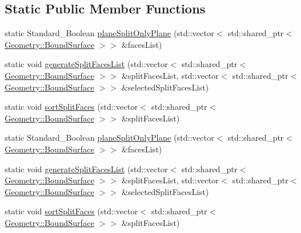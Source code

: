 \subsection*{Static Public Member Functions}
\begin{DoxyCompactItemize}
\item 
static Standard\+\_\+\+Boolean \hyperlink{classMcCAD_1_1Decomposition_1_1SplitSurfaces_1_1Impl_afb4f6c10fc6885bef90911da17ca9836}{plane\+Split\+Only\+Plane} (std\+::vector$<$ std\+::shared\+\_\+ptr$<$ \hyperlink{classMcCAD_1_1Geometry_1_1BoundSurface}{Geometry\+::\+Bound\+Surface} $>$$>$ \&faces\+List)
\item 
static void \hyperlink{classMcCAD_1_1Decomposition_1_1SplitSurfaces_1_1Impl_a4430db732d0f33db4b1aaa1ef38fbe76}{generate\+Split\+Faces\+List} (std\+::vector$<$ std\+::shared\+\_\+ptr$<$ \hyperlink{classMcCAD_1_1Geometry_1_1BoundSurface}{Geometry\+::\+Bound\+Surface} $>$$>$ \&split\+Faces\+List, std\+::vector$<$ std\+::shared\+\_\+ptr$<$ \hyperlink{classMcCAD_1_1Geometry_1_1BoundSurface}{Geometry\+::\+Bound\+Surface} $>$$>$ \&selected\+Split\+Faces\+List)
\item 
static void \hyperlink{classMcCAD_1_1Decomposition_1_1SplitSurfaces_1_1Impl_ab385ab8a9096d1617a54dd2080956a0a}{sort\+Split\+Faces} (std\+::vector$<$ std\+::shared\+\_\+ptr$<$ \hyperlink{classMcCAD_1_1Geometry_1_1BoundSurface}{Geometry\+::\+Bound\+Surface} $>$$>$ \&split\+Faces\+List)
\item 
static Standard\+\_\+\+Boolean \hyperlink{classMcCAD_1_1Decomposition_1_1SplitSurfaces_1_1Impl_afb4f6c10fc6885bef90911da17ca9836}{plane\+Split\+Only\+Plane} (std\+::vector$<$ std\+::shared\+\_\+ptr$<$ \hyperlink{classMcCAD_1_1Geometry_1_1BoundSurface}{Geometry\+::\+Bound\+Surface} $>$$>$ \&faces\+List)
\item 
static void \hyperlink{classMcCAD_1_1Decomposition_1_1SplitSurfaces_1_1Impl_af59b83cb604949e3efb017a17342f9c5}{generate\+Split\+Faces\+List} (std\+::vector$<$ std\+::shared\+\_\+ptr$<$ \hyperlink{classMcCAD_1_1Geometry_1_1BoundSurface}{Geometry\+::\+Bound\+Surface} $>$$>$ \&split\+Faces\+List, std\+::vector$<$ std\+::shared\+\_\+ptr$<$ \hyperlink{classMcCAD_1_1Geometry_1_1BoundSurface}{Geometry\+::\+Bound\+Surface} $>$$>$ \&selected\+Split\+Faces\+List)
\item 
static void \hyperlink{classMcCAD_1_1Decomposition_1_1SplitSurfaces_1_1Impl_ac6aa64ac9950feda60c68cd2538c855a}{sort\+Split\+Faces} (std\+::vector$<$ std\+::shared\+\_\+ptr$<$ \hyperlink{classMcCAD_1_1Geometry_1_1BoundSurface}{Geometry\+::\+Bound\+Surface} $>$$>$ \&split\+Faces\+List)
\end{DoxyCompactItemize}



